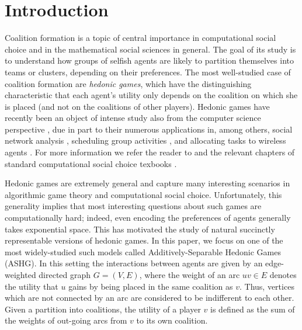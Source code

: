 \documentclass[letterpaper,USenglish,cleveref, autoref, thm-restate]{lipics-v2021}
\begin{document}
\section{Introduction}

Coalition formation is a topic of central importance in computational social
choice and in the mathematical social sciences in general. The goal of its
study is to understand how groups of selfish agents are likely to partition
themselves into teams or clusters, depending on their preferences. The most
well-studied case of coalition formation are \emph{hedonic games}, which have
the distinguishing characteristic that each agent's utility only depends on the
coalition on which she is placed (and not on the coalitions of other players).
Hedonic games have recently been an object of intense study also from the
computer science perspective
\cite{AloisioFV20,AzizBBHOP19,BarrotOSY19,BarrotY19,BoehmerE20,0001BW21,BullingerK21,0001MM21,IgarashiOSY19,OhtaBISY17,SliwinskiZ17},
due in part to their numerous applications in, among others, social network
analysis \cite{Olsen09}, scheduling group activities \cite{DarmannEKLSW18}, and
allocating tasks to wireless agents \cite{SaadHBDH11}. For more information we
refer the reader to \cite{Cechlarova16} and the relevant chapters of standard
computational social choice texbooks \cite{AzizS16}.


Hedonic games are extremely general and capture many interesting scenarios in
algorithmic game theory and computational social choice. Unfortunately, this
generality implies that most interesting questions about such games are
computationally hard; indeed, even encoding the preferences of agents generally
takes exponential space. This has motivated the study of natural succinctly
representable versions of hedonic games.  In this paper, we focus on one of the
most widely-studied such models called Additively-Separable Hedonic Games
(ASHG).  In this setting the interactions between agents are given by an
edge-weighted directed graph $G=(V,E)$, where the weight of an arc $uv\in E$
denotes the utility that $u$ gains by being placed in the same coalition as
$v$. Thus, vertices which are not connected by an arc are considered to be
indifferent to each other. Given a partition into coalitions, the utility of a
player $v$ is defined as the sum of the weights of out-going arcs from $v$ to
its own coalition. 
\end{document}
